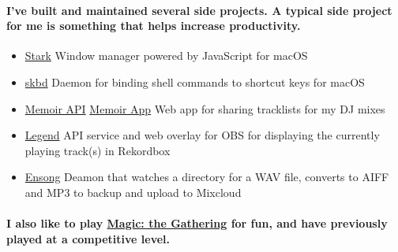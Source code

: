 \documentclass[a4paper]{article}
\newcommand{\languagetag}[1]{
  \raisebox{0.3\height}{\tiny #1}
}
\begin{document}
\paragraph{I've built and maintained several side projects. A typical side project for me is something that helps increase productivity.}
\begin{itemize}
  \item \href{https://github.com/starkwm/stark}{Stark} \languagetag{(Swift)} Window manager powered by JavaScript for macOS
  \item \href{https://github.com/tombell/skbd}{skbd} \languagetag{(Swift)} Daemon for binding shell commands to shortcut keys for macOS
  \item \href{https://github.com/tombell/memoir}{Memoir API} \languagetag{(Go)} \href{https://github.com/tombell/memoir-app}{Memoir App} \languagetag{(TypeScript, Preact)} Web app for sharing tracklists for my DJ mixes
  \item \href{https://github.com/tombell/legend}{Legend} \languagetag{(Go, TypeScript, Preact)} API service and web overlay for OBS for displaying the currently playing track(s) in Rekordbox
  \item \href{https://github.com/tombell/ensong}{Ensong} \languagetag{(Go)} Deamon that watches a directory for a WAV file, converts to AIFF and MP3 to backup and upload to Mixcloud
\end{itemize}
\paragraph{I also like to play \href{https://magic.wizards.com/en}{Magic: the Gathering} for fun, and have previously played at a competitive level.}
\end{document}
